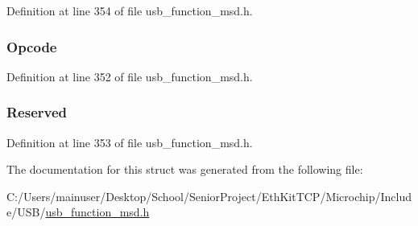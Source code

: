 Definition at line 354 of file usb\+\_\+function\+\_\+msd.\+h.

\hypertarget{struct_test_unit_ready_c_b_a3ac7536b907732d60214ae553910eed9}{}
\subsubsection[{Opcode}]{ Opcode}\label{struct_test_unit_ready_c_b_a3ac7536b907732d60214ae553910eed9}


Definition at line 352 of file usb\+\_\+function\+\_\+msd.\+h.

\hypertarget{struct_test_unit_ready_c_b_a2fe98cf51e48db450cf359cdd8ffbf9b}{}
\subsubsection[{Reserved}]{ Reserved}\label{struct_test_unit_ready_c_b_a2fe98cf51e48db450cf359cdd8ffbf9b}


Definition at line 353 of file usb\+\_\+function\+\_\+msd.\+h.



The documentation for this struct was generated from the following file\+:\begin{DoxyCompactItemize}
\item 
C\+:/\+Users/mainuser/\+Desktop/\+School/\+Senior\+Project/\+Eth\+Kit\+T\+C\+P/\+Microchip/\+Include/\+U\+S\+B/\hyperlink{usb__function__msd_8h}{usb\+\_\+function\+\_\+msd.\+h}\end{DoxyCompactItemize}
